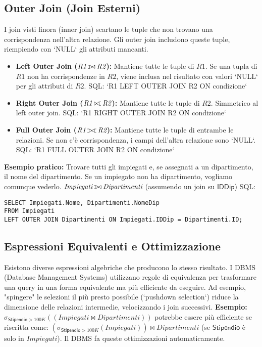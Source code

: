 \documentclass{article}
\newcommand{\Rel}[1]{\textit{#1}} %
\newcommand{\Attr}[1]{\textsf{#1}} %
\newcommand{\myselectop}[2]{\sigma_{#1}(#2)}
\newcommand{\mynaturaljoin}{\bowtie} %
\def\ojoin{\setbox0=\hbox{$\mynaturaljoin$}%
	\rule[-.02ex]{.25em}{.4pt}\llap{\rule[\ht0]{.25em}{.4pt}}}
\newcommand{\myleftouterjoin}{\mathbin{\ojoin\mkern-5.8mu\mynaturaljoin}}
\newcommand{\myrightouterjoin}{\mathbin{\mynaturaljoin\mkern-5.8mu\ojoin}}
\newcommand{\myfullouterjoin}{\mathbin{\ojoin\mkern-5.8mu\mynaturaljoin\mkern-5.8mu\ojoin}}
\begin{document}
	\subsection{Outer Join (Join Esterni)}
	I join visti finora (inner join) scartano le tuple che non trovano una corrispondenza nell'altra relazione. Gli outer join includono queste tuple, riempiendo con `NULL` gli attributi mancanti.
	\begin{itemize}
		\item \textbf{Left Outer Join ($\Rel{R1} \myleftouterjoin \Rel{R2}$):} Mantiene tutte le tuple di $\Rel{R1}$. Se una tupla di $\Rel{R1}$ non ha corrispondenze in $\Rel{R2}$, viene inclusa nel risultato con valori `NULL` per gli attributi di $\Rel{R2}$.
		SQL: `R1 LEFT OUTER JOIN R2 ON condizione`
		\item \textbf{Right Outer Join ($\Rel{R1} \myrightouterjoin \Rel{R2}$):} Mantiene tutte le tuple di $\Rel{R2}$. Simmetrico al left outer join.
		SQL: `R1 RIGHT OUTER JOIN R2 ON condizione`
		\item \textbf{Full Outer Join ($\Rel{R1} \myfullouterjoin \Rel{R2}$):} Mantiene tutte le tuple di entrambe le relazioni. Se non c'è corrispondenza, i campi dell'altra relazione sono `NULL`.
		SQL: `R1 FULL OUTER JOIN R2 ON condizione`
	\end{itemize}
	\textbf{Esempio pratico:} Trovare tutti gli impiegati e, se assegnati a un dipartimento, il nome del dipartimento. Se un impiegato non ha dipartimento, vogliamo comunque vederlo.
	$\Rel{Impiegati} \myleftouterjoin \Rel{Dipartimenti}$ (assumendo un join su $\Attr{IDDip}$)
	SQL:
	\begin{verbatim}
SELECT Impiegati.Nome, Dipartimenti.NomeDip
FROM Impiegati
LEFT OUTER JOIN Dipartimenti ON Impiegati.IDDip = Dipartimenti.ID;
	\end{verbatim}
	
	\subsection{Espressioni Equivalenti e Ottimizzazione}
	Esistono diverse espressioni algebriche che producono lo stesso risultato. I DBMS (Database Management Systems) utilizzano regole di equivalenza per trasformare una query in una forma equivalente ma più efficiente da eseguire.
	Ad esempio, "spingere" le selezioni il più presto possibile (`pushdown selection`) riduce la dimensione delle relazioni intermedie, velocizzando i join successivi.
	\textbf{Esempio:}
	$\myselectop{\Attr{Stipendio}>100K}{(\Rel{Impiegati} \mynaturaljoin \Rel{Dipartimenti})}$
	potrebbe essere più efficiente se riscritta come:
	$(\myselectop{\Attr{Stipendio}>100K}{\Rel{Impiegati}}) \mynaturaljoin \Rel{Dipartimenti}$
	(se $\Attr{Stipendio}$ è solo in $\Rel{Impiegati}$). Il DBMS fa queste ottimizzazioni automaticamente.
	
\end{document}

